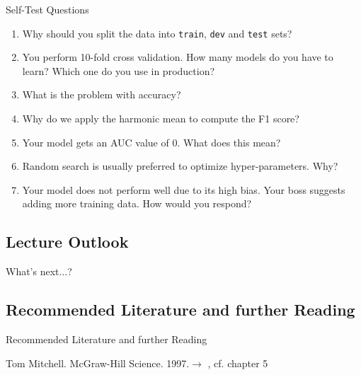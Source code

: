 \begin{frame}{Self-Test Questions}{}\important
	\begin{enumerate}
		\item Why should you split the data into \texttt{train}, \texttt{dev} and \texttt{test} sets?
		\item You perform 10-fold cross validation. How many models do you have to learn? Which one do you use in production?
		\item What is the problem with accuracy?
		\item Why do we apply the harmonic mean to compute the F1 score?
		\item Your model gets an AUC value of 0. What does this mean?
		\item Random search is usually preferred to optimize hyper-parameters. Why?
		\item Your model does not perform well due to its high bias.
			Your boss suggests adding more training data. How would you respond?
	\end{enumerate}
\end{frame}


\subsection{Lecture Outlook}

\begin{frame}{What's next...?}{}
\end{frame}


\subsection{Recommended Literature and further Reading}

\begin{frame}{Recommended Literature and further Reading}{}
	\footnotesize
	\begin{thebibliography}{2}
			{Tom Mitchell. McGraw-Hill Science. 1997.}{$\rightarrow$ \href{
				https://www.cs.ubbcluj.ro/~gabis/ml/ml-books/McGrawHill\%20-\%20Machine\%20Learning\%20-Tom\%20Mitchell.pdf
			}{}, cf. chapter 5}
	\end{thebibliography}
\end{frame}


